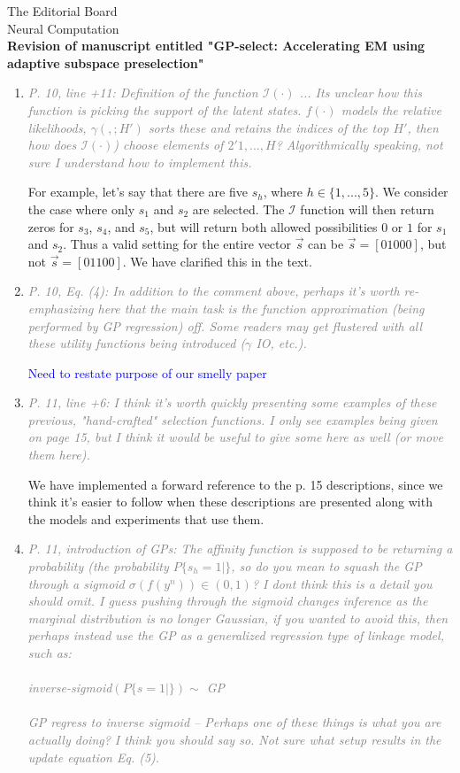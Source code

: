 \documentclass[10pt]{letter}
\newcommand{\rvr}[1]{\textcolor{gray}{#1}}
\newcommand{\rev}[1]{\textcolor{blue}{#1}}
\begin{document}
\begin{letter}{
The Editorial Board\\
Neural Computation\\
\vspace{10mm}
\textbf{Revision of manuscript entitled "GP-select: Accelerating EM using adaptive
subspace preselection"}
}
\begin{enumerate}[topsep=3pt,itemsep=2ex,partopsep=1ex,parsep=1ex]
    \item \rvr{\emph{P. 10, line +11: Definition of the function $\mathcal{I}( \cdot )$ ... Its unclear how this function is picking the support of the latent states. $f( \cdot )$ models the relative likelihoods, $\gamma( , ; H' )$ sorts these and retains the indices of the top $H'$, then how does $\mathcal{I}( \cdot )$) choose elements of $2'{1 ,...,H}$? Algorithmically speaking, not sure I understand how to implement this.}}

For example, let's say that there are five $s_h$, where $h\in \{1,...,5\}$. We consider the case where only $s_1$   and $s_2$   are selected.  The $\mathcal{I}$ function will then return zeros for $s_3$, $s_4$, and $s_5$, but will  return both allowed possibilities $0$ or $1$ for $s_1$ and $s_2$. Thus a valid setting for the entire vector $\vec{s}$ can be $\vec{s}=[0 1 0 0 0]$, but not $\vec{s}=[0 1 1 0 0]$. We have clarified this in the text.

    \item \rvr{\emph{P. 10, Eq. (4): In addition to the comment above, perhaps it's worth re-emphasizing here that the main task is the function approximation (being performed by GP regression) off. Some readers may get flustered with all these utility functions being introduced ($\gamma$ IO, etc.).}}

\rev{Need to restate purpose of our smelly paper}

    \item \rvr{\emph{P. 11, line +6: I think it's worth quickly presenting some examples of these previous, "hand-crafted"  selection functions. I only see examples being given on page 15, but I think it would be useful to give some here as well (or move them here).}}

We have implemented a forward reference to the p. 15 descriptions, since we think it's easier to follow when these descriptions are presented along with the models and experiments that use them.


    \item \rvr{\emph{P. 11, introduction of GPs: The affinity function is supposed to be returning a probability (the probability $P \{ s_h = 1 |   \}$, so do you mean to squash the GP through a sigmoid $\sigma(f(y^n)) \in (0,1)$? I dont think this is a detail you should omit. I guess pushing through the sigmoid changes inference as the marginal distribution is no longer Gaussian, if you wanted to avoid this, then perhaps instead use the GP as a generalized regression type of linkage model, such as:\\ \\
inverse-sigmoid$( P\{ s = 1 |   \} ) \sim$ GP \\ \\
GP regress to inverse sigmoid -- Perhaps one of these things is what you are actually doing? I think you should say so.
Not sure what setup results in the update equation 
Eq. (5).}}


\end{enumerate}
\end{letter}
\end{document}

